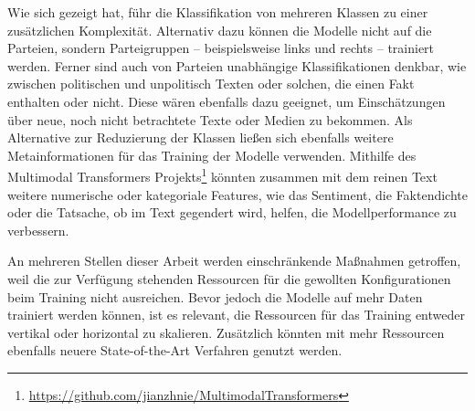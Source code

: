 Wie sich gezeigt hat, führ die Klassifikation von mehreren Klassen zu einer zusätzlichen Komplexität. Alternativ dazu können die Modelle nicht auf die Parteien, sondern Parteigruppen -- beispielsweise links und rechts -- trainiert werden. Ferner sind auch von Parteien unabhängige Klassifikationen denkbar, wie zwischen politischen und unpolitisch Texten oder solchen, die einen Fakt enthalten oder nicht. Diese wären ebenfalls dazu geeignet, um Einschätzungen über neue, noch nicht betrachtete Texte oder Medien zu bekommen. Als Alternative zur Reduzierung der Klassen ließen sich ebenfalls weitere Metainformationen für das Training der Modelle verwenden. Mithilfe des Multimodal Transformers Projekts\footnote{\href{https://github.com/jianzhnie/MultimodalTransformers}{https://github.com/jianzhnie/MultimodalTransformers}} könnten zusammen mit dem reinen Text weitere numerische oder kategoriale Features, wie das Sentiment, die Faktendichte oder die Tatsache, ob im Text gegendert wird, helfen, die Modellperformance zu verbessern.

An mehreren Stellen dieser Arbeit werden einschränkende Maßnahmen getroffen, weil die zur Verfügung stehenden Ressourcen für die gewollten Konfigurationen beim Training nicht ausreichen. Bevor jedoch die Modelle auf mehr Daten trainiert werden können, ist es relevant, die Ressourcen für das Training entweder vertikal oder horizontal zu skalieren. Zusätzlich könnten mit mehr Ressourcen ebenfalls neuere State-of-the-Art Verfahren genutzt werden.
